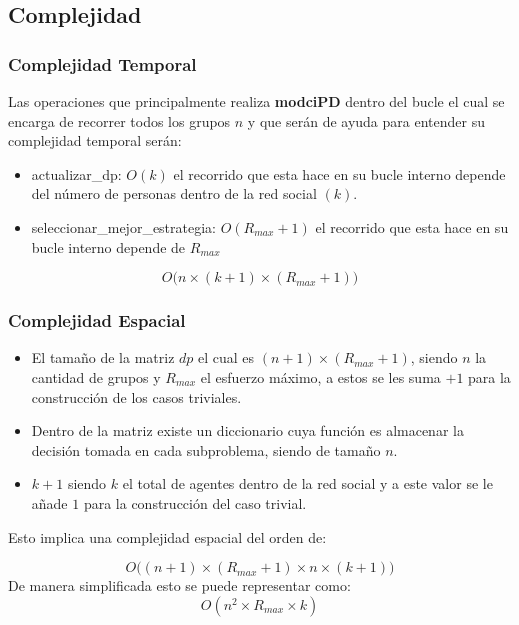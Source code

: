 \documentclass[11pt,letter]{article}
\begin{document}
    \subsection{Complejidad}
    \subsubsection{Complejidad Temporal}

    Las operaciones que principalmente realiza \textbf{modciPD} dentro del bucle el cual se encarga de recorrer todos los grupos $n$ y que serán de ayuda para entender su complejidad temporal serán:

    \begin{itemize}
        \item actualizar\_dp: $O(k)$ el recorrido que esta hace en su bucle interno depende del número de personas dentro de la red social $(k)$.

        \item seleccionar\_mejor\_estrategia: $O(R_{max}+1)$ el recorrido que esta hace en su bucle interno depende de $R_{max}$
    \end{itemize}

    $$O\bigg(n\times (k+1) \times (R_{max}+1)\bigg)$$

    \subsubsection{Complejidad Espacial}

    \begin{itemize}
        \item El tamaño de la matriz $dp$ el cual es $(n+1) \times (R_{max}+1)$, siendo $n$ la cantidad de grupos y $R_{max}$ el esfuerzo máximo, a estos se les suma $+1$ para la construcción de los casos triviales.
        \item Dentro de la matriz existe un diccionario cuya función es almacenar la decisión tomada en cada subproblema, siendo de tamaño $n$.
        \item $k+1$ siendo $k$ el total de agentes dentro de la red social y a este valor se le añade $1$ para la construcción del caso trivial.
    \end{itemize}

    Esto implica una complejidad espacial del orden de:

    \[
        O\bigg((n+1) \times (R_{max}+1) \times n \times (k+1)\bigg)
    \]
    De manera simplificada esto se puede representar como:
    \[
        O(n^2 \times R_{max} \times k)
    \]
\end{document}

